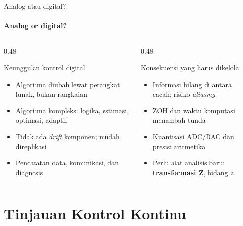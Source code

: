 \documentclass[aspectratio=169,10pt]{beamer}
\begin{document}
\begin{frame}{Analog atau digital?}
	\framesubtitle{Analog or digital?}
	\begin{columns}[T]
		\begin{column}{0.48\textwidth}
			\begin{exampleblock}{Keunggulan kontrol digital}
				\small
				\begin{itemize}
					\item Algoritma diubah lewat perangkat lunak, bukan rangkaian
					\item Algoritma kompleks: logika, estimasi, optimasi, adaptif
					\item Tidak ada \textit{drift} komponen; mudah direplikasi
					\item Pencatatan data, komunikasi, dan diagnosis
				\end{itemize}
			\end{exampleblock}
		\end{column}
		\begin{column}{0.48\textwidth}
			\begin{alertblock}{Konsekuensi yang harus dikelola}
				\small
				\begin{itemize}
					\item Informasi hilang di antara cacah; risiko \textit{aliasing}
					\item ZOH dan waktu komputasi menambah \alert{tunda}
					\item Kuantisasi ADC/DAC dan presisi aritmetika
					\item Perlu alat analisis baru: \textbf{transformasi Z}, bidang $z$
				\end{itemize}
			\end{alertblock}
		\end{column}
	\end{columns}
\end{frame}

\section{Tinjauan Kontrol Kontinu\texorpdfstring{\\[4pt]{\Large{}}}{ / Review of Continuous Control}}
\end{document}
